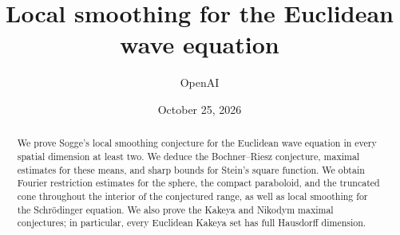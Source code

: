 \documentclass[11pt,letterpaper]{article}
\title{Local smoothing for the Euclidean wave equation}
\author{OpenAI}\date{October 25, 2026}
\theoremstyle{definition}\newtheorem{definition}[theorem]{Definition}
\theoremstyle{remark}\newtheorem{remark}[theorem]{Remark}
\numberwithin{equation}{section}
\begin{document}
\maketitle
\begin{abstract}
We prove Sogge's local smoothing conjecture for the Euclidean wave
equation in every spatial dimension at least two. We deduce the
Bochner--Riesz conjecture, maximal estimates for these means, and sharp
bounds for Stein's square function. We obtain Fourier restriction
estimates for the sphere, the compact paraboloid, and the truncated cone
throughout the interior of the conjectured range, as well as local smoothing for the
Schr\"odinger equation. We also prove the Kakeya and Nikodym maximal
conjectures; in particular, every Euclidean Kakeya set has full
Hausdorff dimension.
\end{abstract}












\appendix
{}







\end{document}
